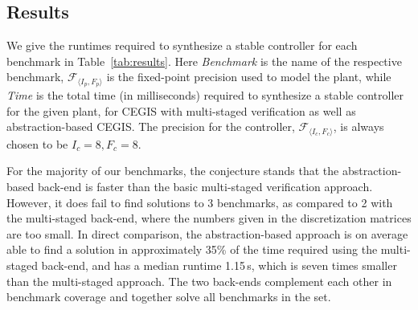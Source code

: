 \documentclass[runningheads,a4paper]{llncs}
\begin{document}
\subsection{Results}

We give the runtimes required to synthesize a stable controller for each
benchmark in Table~\ref{tab:results}.  
Here \textit{Benchmark} is the name of the respective
benchmark, $\mathcal{F}_{\langle I_p,F_p \rangle}$ is the fixed-point precision used
to model the plant, while \textit{Time}
is the total time (in milliseconds) required to synthesize a stable controller
for the given plant, for CEGIS with multi-staged verification as well as
abstraction-based CEGIS. The precision for the controller,
$\mathcal{F}_{\langle I_c,F_c \rangle}$, is always chosen to be $I_c = 8, F_c = 8$.

For the majority of our benchmarks, the conjecture stands that the abstraction-based back-end
is faster than the basic multi-staged verification approach. However, it does fail to
find solutions to 3 benchmarks, as compared to 2 with the multi-staged back-end, where
the numbers given in the discretization matrices are too small. In direct comparison, the
abstraction-based approach is on average able to find a solution in approximately 35\% of
the time required using the multi-staged back-end, and has a median runtime 1.15\,s, which is
seven times smaller than the multi-staged approach. The two back-ends complement each other
in benchmark coverage and together solve all benchmarks in the set.
\end{document}
